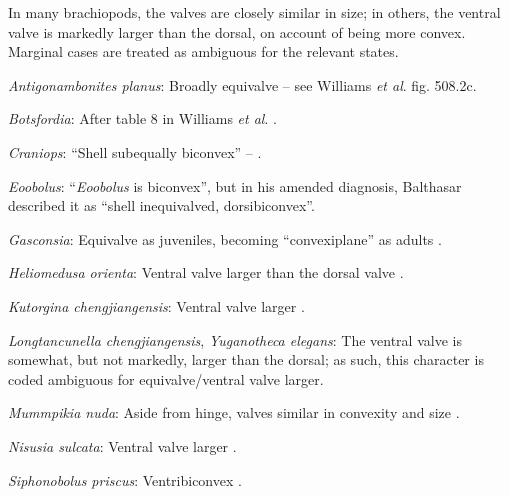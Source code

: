 \documentclass[openany]{book}
\begin{document}
In many brachiopods, the valves are closely similar in size; in others,
the ventral valve is markedly larger than the dorsal, on account of
being more convex. Marginal cases are treated as ambiguous for the
relevant states.

\hypertarget{Antigonambonites_planus-coding-104}{}
\emph{Antigonambonites planus}: Broadly equivalve -- see Williams
\emph{et al}. \citeyearpar{Williams2000LinguliformeaCraniiformea} fig.
508.2c.

\hypertarget{Botsfordia-coding-104}{}
\emph{Botsfordia}: After table 8 in Williams \emph{et al}.
\citeyearpar{Williams2000LinguliformeaCraniiformea}.

\hypertarget{Craniops-coding-104}{}
\emph{Craniops}: ``Shell subequally biconvex'' --
\citet{Williams2000LinguliformeaCraniiformea}.

\hypertarget{Eoobolus-coding-104}{}
\emph{Eoobolus}: ``\emph{Eoobolus} is biconvex'', but in his amended
diagnosis, Balthasar \citeyearpar{Balthasar2009Thebrachiopod} described
it as ``shell inequivalved, dorsibiconvex''.

\hypertarget{Gasconsia-coding-104}{}
\emph{Gasconsia}: Equivalve as juveniles, becoming ``convexiplane''
\citep[p.~187]{Williams2000LinguliformeaCraniiformea} as adults
\citep{Hanken1985Thetaxonomy}.

\hypertarget{Heliomedusa_orienta-coding-104}{}
\emph{Heliomedusa orienta}: Ventral valve larger than the dorsal valve
\citep[p.~659]{Zhang2009Architectureand}.

\hypertarget{Kutorgina_chengjiangensis-coding-104}{}
\emph{Kutorgina chengjiangensis}: Ventral valve larger \citep[see][fig.
125.]{Williams2000LinguliformeaCraniiformea}.

\hypertarget{Longtancunella_chengjiangensis-coding-104}{}
\emph{Longtancunella chengjiangensis}, \emph{Yuganotheca elegans}: The
ventral valve is somewhat, but not markedly, larger than the dorsal; as
such, this character is coded ambiguous for equivalve/ventral valve
larger.

\hypertarget{Mummpikia_nuda-coding-104}{}
\emph{Mummpikia nuda}: Aside from hinge, valves similar in convexity and
size \citep{Balthasar2008iMummpikia}.

\hypertarget{Nisusia_sulcata-coding-104}{}
\emph{Nisusia sulcata}: Ventral valve larger \citep[see][fig.
126.]{Williams2000LinguliformeaCraniiformea}.

\hypertarget{Siphonobolus_priscus-coding-104}{}
\emph{Siphonobolus priscus}: Ventribiconvex
\citep{Popov2009Earlyontogeny}.
\end{document}
